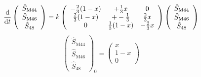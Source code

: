 \documentclass{article}
\begin{document}
\begin{equation}
\frac{\mathrm{d}}{\mathrm{d} t} \left( \begin{array}{c}  \hat{S}_\text{M44} \\ \hat{S}_\text{M46}\\ \hat{S}_\text{48} 
\end{array}  \right) = k \left( \begin{array}{c c c}   -\frac{2}{3}(1-x) & + \frac{1}{3}x & 0 \\  \frac{2}{3}(1-x) & + -\frac{1}{3} & \frac{2}{3}x \\  0 & \frac{1}{3}(1-x) & -\frac{2}{3}x
\end{array}  \right) \left(\begin{array}{c}  \hat{S}_\text{M44} \\ \hat{S}_\text{M46}\\ \hat{S}_\text{48} 
\end{array}  \right)
\end{equation}
\begin{equation}
\left(\begin{array}{c}  \hat{S}_\text{M44} \\ \hat{S}_\text{M46}\\ \hat{S}_\text{48} 
\end{array}  \right)_0 = \left(\begin{array}{c}  x \\ 1-x \\ 0 
\end{array}  \right)
\end{equation}
\end{document}
